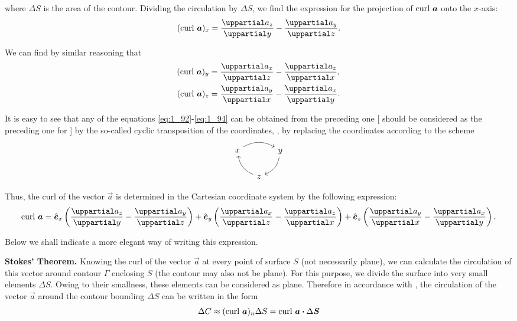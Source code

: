 \noindent
where $\Delta{S}$ is the area of the contour. Dividing the circulation by $\Delta{S}$, we find the expression for the projection of $\text{curl~}\boldsymbol{a}$ onto the $x$-axis:
\begin{equation}\label{eq:1_92}
	(\curl{\vec{a}})_x = \diffpartial{a_z}{y} - \diffpartial{a_y}{z}.
\end{equation}

\noindent
We can find by similar reasoning that
\begin{align}
	(\curl{\vec{a}})_y &= \diffpartial{a_x}{z} - \diffpartial{a_z}{x}, \label{eq:1_93}\\
	(\curl{\vec{a}})_z &= \diffpartial{a_y}{x} - \diffpartial{a_x}{y}. \label{eq:1_94}
\end{align}

It is easy to see that any of the equations \eqref{eq:1_92}-\eqref{eq:1_94} can be obtained from the preceding one [ should be considered as the preceding one for ] by the so-called cyclic transposition of the coordinates, \ie, by replacing the coordinates according to the scheme
\begin{equation*}
	\begin{tikzcd}[column sep=small]
x \arrow[rr, bend left] &           & y \arrow[ld, bend left] \\
                        & z \arrow[lu, bend left] &
\end{tikzcd}
\end{equation*}

Thus, the curl of the vector $\vec{a}$ is determined in the Cartesian coordinate system by the following expression:
\begin{equation}\label{eq:1_95}
	\curl{\vec{a}} = \vecuni{x}\parenthesis{\diffpartial{a_z}{y} - \diffpartial{a_y}{z}} + \vecuni{y}\parenthesis{\diffpartial{a_x}{z} - \diffpartial{a_z}{x}} + \vecuni{z}\parenthesis{\diffpartial{a_y}{x} - \diffpartial{a_x}{y}}.
\end{equation}

\noindent
Below we shall indicate a more elegant way of writing this expression.

\textbf{Stokes' Theorem.} Knowing the curl of the vector $\vec{a}$ at every point of surface $S$ (not necessarily plane), we can calculate the circulation of this vector around contour $\Gamma$ enclosing $S$ (the contour may also not be plane). For this purpose, we divide the surface into very small elements $\Delta{S}$. Owing to their smallness, these elements can be considered as plane. Therefore in accordance with , the circulation of the vector $\vec{a}$ around the contour bounding $\Delta{S}$ can be written in the form
\begin{equation}\label{eq:1_96}
	\Delta{C} \approx (\text{curl~}\boldsymbol{a})_n \Delta{S} = \text{curl~}\boldsymbol{a} \boldsymbol{\cdot} \Delta{\boldsymbol{S}}
\end{equation}

